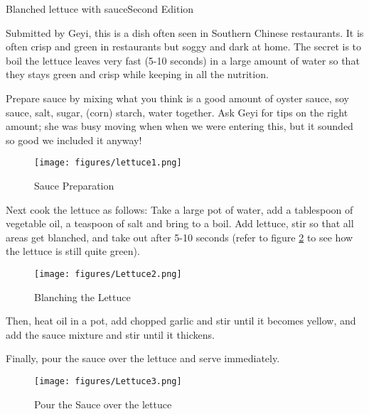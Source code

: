 \begin{entry}{Blanched lettuce with sauce}{Second Edition}

\begin{open}
  Submitted by Geyi, this is a dish often seen in Southern Chinese restaurants. It is often crisp and green in restaurants but soggy and dark at home. The secret is to boil the lettuce leaves very fast (5-10 seconds) in a large amount of water so that they stays green and crisp while keeping in all the nutrition.
\end{open}

%

\vspace{1\baselineskip}
Prepare sauce by mixing what you think is a good amount of oyster sauce, soy sauce, salt, sugar, (corn) starch, water together. Ask Geyi for tips on the right amount; she was busy moving when when we were entering this, but it sounded so good we included it anyway!

\begin{figure}[h]
    \centering
    \texttt{[image: figures/lettuce1.png]}
    \caption{Sauce Preparation}
    \label{fig:Lettuce1}
\end{figure}

Next cook the lettuce as follows: Take a large pot of water, add a tablespoon of vegetable oil, a teaspoon of salt and bring to a boil. Add lettuce, stir so that all areas get blanched, and take out after 5-10 seconds (refer to figure \ref{fig:lettuce2} to see how the lettuce is still quite green).

\begin{figure}
    \centering
    \texttt{[image: figures/Lettuce2.png]}
    \caption{Blanching the Lettuce}
    \label{fig:lettuce2}
\end{figure}

Then, heat oil in a pot, add chopped garlic and stir until it becomes yellow, and add the sauce mixture and stir until it thickens.

Finally, pour the sauce over the lettuce and serve immediately.

\begin{figure}
    \centering
    \texttt{[image: figures/Lettuce3.png]}
    \caption{Pour the Sauce over the lettuce}
    \label{fig:lettuce3}
\end{figure}

\end{entry}

